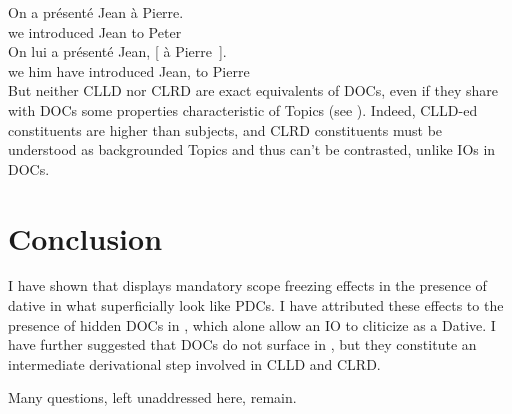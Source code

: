 \documentclass[output=paper]{langsci/langscibook}
\begin{document}
\ea \label{clrd}
\ea
    \gll  On {a pr\'{e}sent\'{e}} Jean \`a Pierre.\\
    we introduced Jean to Peter\\
\ex
	\gll  On      lui a   pr\'{e}sent\'{e}    Jean,  [ \`a Pierre~].\\
    we  him\tss{\Dat} have introduced     Jean, {} to Pierre \\
\z
\z
%
But neither CLLD nor \gls{CLRD} are exact
equivalents of \glspl{DOC}, even if they share with \glspl{DOC} some properties
characteristic of Topics (see \citealt{Polinsky:1996}). Indeed, \gls{CLLD}-ed
constituents are higher than subjects, and \gls{CLRD} constituents must be understood as backgrounded Topics and thus
can't be contrasted, unlike \glspl{IO} in \glspl{DOC}.

\section{Conclusion}

I have shown that  displays mandatory scope freezing effects in the
presence of dative  in what superficially look like \glspl{PDC}. I have
attributed these effects to the presence of hidden \glspl{DOC} in , which
alone allow an IO to cliticize as a Dative. I have further suggested that
\glspl{DOC} do not surface in , but they constitute an intermediate
derivational step  involved in \gls{CLLD} and
\gls{CLRD}.

Many questions, left unaddressed here, remain.
\end{document}
